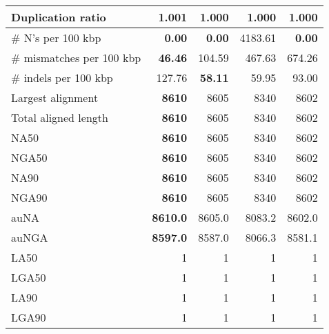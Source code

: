 \documentclass[12pt,a4paper]{article}
\begin{document}
\begin{table}[ht]
\begin{center}
\begin{tabular}{|l*{4}{|r}|}
Duplication ratio & 1.001 & {\bf 1.000} & {\bf 1.000} & {\bf 1.000} \\ \hline
\# N's per 100 kbp & {\bf 0.00} & {\bf 0.00} & 4183.61 & {\bf 0.00} \\ \hline
\# mismatches per 100 kbp & {\bf 46.46} & 104.59 & 467.63 & 674.26 \\ \hline
\# indels per 100 kbp & 127.76 & {\bf 58.11} & 59.95 & 93.00 \\ \hline
Largest alignment & {\bf 8610} & 8605 & 8340 & 8602 \\ \hline
Total aligned length & {\bf 8610} & 8605 & 8340 & 8602 \\ \hline
NA50 & {\bf 8610} & 8605 & 8340 & 8602 \\ \hline
NGA50 & {\bf 8610} & 8605 & 8340 & 8602 \\ \hline
NA90 & {\bf 8610} & 8605 & 8340 & 8602 \\ \hline
NGA90 & {\bf 8610} & 8605 & 8340 & 8602 \\ \hline
auNA & {\bf 8610.0} & 8605.0 & 8083.2 & 8602.0 \\ \hline
auNGA & {\bf 8597.0} & 8587.0 & 8066.3 & 8581.1 \\ \hline
LA50 & 1 & 1 & 1 & 1 \\ \hline
LGA50 & 1 & 1 & 1 & 1 \\ \hline
LA90 & 1 & 1 & 1 & 1 \\ \hline
LGA90 & 1 & 1 & 1 & 1 \\ \hline
\end{tabular}
\end{center}
\end{table}
\end{document}

